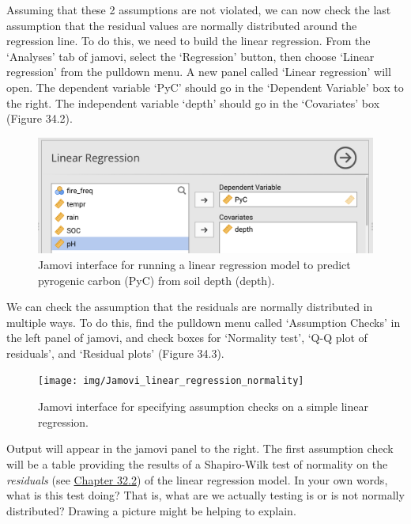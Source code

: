 \documentclass[
]{scrbook}
\begin{document}
Assuming that these 2 assumptions are not violated, we can now check the last assumption that the residual values are normally distributed around the regression line.
To do this, we need to build the linear regression.
From the `Analyses' tab of jamovi, select the `Regression' button, then choose `Linear regression' from the pulldown menu.
A new panel called `Linear regression' will open.
The dependent variable `PyC' should go in the `Dependent Variable' box to the right.
The independent variable `depth' should go in the `Covariates' box (Figure 34.2).

\begin{figure}
\includegraphics[width=1\linewidth]{img/Jamovi_linear_regression} \caption{Jamovi interface for running a linear regression model to predict pyrogenic carbon (PyC) from soil depth (depth).}\label{fig:unnamed-chunk-176}
\end{figure}

We can check the assumption that the residuals are normally distributed in multiple ways.
To do this, find the pulldown menu called `Assumption Checks' in the left panel of jamovi, and check boxes for `Normality test', `Q-Q plot of residuals', and `Residual plots' (Figure 34.3).

\begin{figure}
\texttt{[image: img/Jamovi\_linear\_regression\_normality]} \caption{Jamovi interface for specifying assumption checks on a simple linear regression.}\label{fig:unnamed-chunk-177}
\end{figure}

Output will appear in the jamovi panel to the right.
The first assumption check will be a table providing the results of a Shapiro-Wilk test of normality on the \emph{residuals} (see \protect\hyperlink{intercepts-slopes-and-residuals}{Chapter 32.2}) of the linear regression model.
In your own words, what is this test doing?
That is, what are we actually testing is or is not normally distributed?
Drawing a picture might be helping to explain.

\begin{verbatim}







\end{verbatim}
\end{document}
